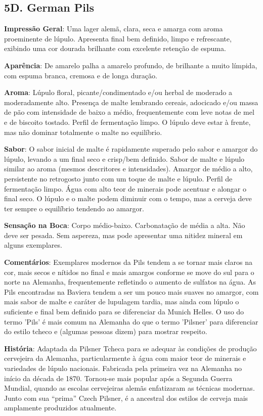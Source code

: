 \subsection*{5D. German Pils}
\textbf{Impressão Geral}: Uma lager alemã, clara, seca e amarga com aroma proeminente de lúpulo. Apresenta final bem definido, limpo e refrescante, exibindo uma cor dourada brilhante com excelente retenção de espuma.

\textbf{Aparência}: De amarelo palha a amarelo profundo, de brilhante a muito límpida, com espuma branca, cremosa e de longa duração.

\textbf{Aroma}: Lúpulo floral, picante/condimentado e/ou herbal de moderado a moderadamente alto. Presença de malte lembrando cereais, adocicado e/ou massa de pão com intensidade de baixo a médio, frequentemente com leve notas de mel e de biscoito tostado. Perfil de fermentação limpo. O lúpulo deve estar à frente, mas não dominar totalmente o malte no equilíbrio.

\textbf{Sabor}: O sabor inicial de malte é rapidamente superado pelo sabor e amargor do lúpulo, levando a um final seco e crisp/bem definido. Sabor de malte e lúpulo similar ao aroma (mesmos descritores e intensidades). Amargor de médio a alto, persistente no retrogosto junto com um toque de malte e lúpulo. Perfil de fermentação limpo. Água com alto teor de minerais pode acentuar e alongar o final seco. O lúpulo e o malte podem diminuir com o tempo, mas a cerveja deve ter sempre o equilíbrio tendendo ao amargor.

\textbf{Sensação na Boca}: Corpo médio-baixo. Carbonatação de média a alta. Não deve ser pesada. Sem aspereza, mas pode apresentar uma nitidez mineral em alguns exemplares.

\textbf{Comentários}: Exemplares modernos da Pils tendem a se tornar mais claros na cor, mais secos e nítidos no final e mais amargos conforme se move do sul para o norte na Alemanha, frequentemente refletindo o aumento de sulfatos na água. As Pils encontradas na Baviera tendem a ser um pouco mais suaves no amargor, com mais sabor de malte e caráter de lupulagem tardia, mas ainda com lúpulo o suficiente e final bem definido para se diferenciar da Munich Helles. O uso do termo 'Pils' é mais comum na Alemanha do que o termo 'Pilsner' para diferenciar do estilo tcheco e (algumas pessoas dizem) para mostrar respeito.

\textbf{História}: Adaptada da Pilsner Tcheca para se adequar às condições de produção cervejeira da Alemanha, particularmente à água com maior teor de minerais e variedades de lúpulo nacionais. Fabricada pela primeira vez na Alemanha no início da década de 1870. Tornou-se mais popular após a Segunda Guerra Mundial, quando as escolas cervejeiras alemãs enfatizaram as técnicas modernas. Junto com sua “prima” Czech Pilsner, é a ancestral dos estilos de cerveja mais amplamente produzidos atualmente.

